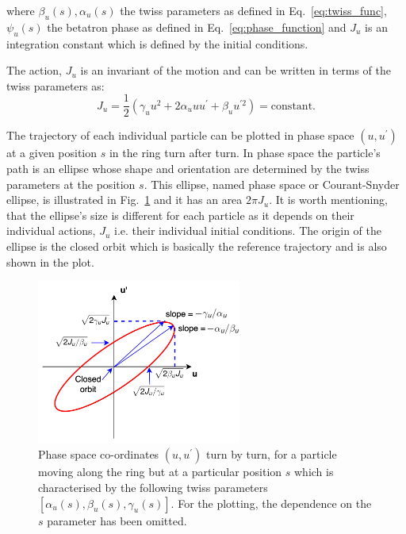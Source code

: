 where $\beta_u(s), \alpha_u(s)$ the twiss parameters as defined in Eq.~\eqref{eq:twiss_func}, $\psi_u(s)$ the betatron phase as defined in Eq.~\eqref{eq:phase_function} and $J_u$ is an integration constant which is defined by the initial conditions. %

The action, $J_u$ is an invariant of the motion and can be written in terms of the twiss parameters as: %
\begin{equation}\label{eq:action_definition}
    J_u = \frac{1}{2} (\gamma_u u^2 + 2 \alpha_u u u^\prime + \beta_u u^{\prime 2}) = \mathrm{constant}.
\end{equation}

The trajectory of each individual particle can be plotted in phase space $(u, u^\prime)$ at a given position $s$ in the ring turn after turn. In phase space the particle's path is an ellipse whose shape and orientation are determined by the twiss parameters at the position $s$. This ellipse, named phase space or Courant-Snyder ellipse, is illustrated in Fig.~\ref{fig:phase_space_ellipse} and it has an area $2\pi J_u$. It is worth mentioning, that the ellipse's size is different for each particle as it depends on their individual actions, $J_u$ i.e. their individual initial conditions. The origin of the ellipse is the closed orbit which is basically the reference trajectory and is also shown in the plot.

\begin{figure}[!h] %
    \centering         
    \includegraphics[width=0.6\textwidth]{images/Ch2/phase_space_ellipse.png}
        \caption{Phase space co-ordinates $(u, u^\prime)$ turn by turn, for a particle moving along the ring but at a particular position $s$ which is characterised by the following twiss parameters $[\alpha_u(s), \beta_u(s), \gamma_u(s)]$. For the plotting, the dependence on the $s$ parameter has been omitted.}
        \label{fig:phase_space_ellipse}
 \end{figure}

